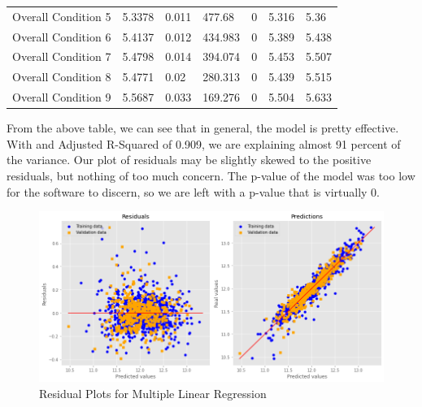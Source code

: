 \documentclass{article}
\begin{document}
\begin{table}[]
\begin{tabular}{lllllll}
		Overall Condition 5              & 5.3378                    & 0.011                        & 477.68                 & 0                                       & 5.316                         & 5.36                          \\
		Overall Condition 6              & 5.4137                    & 0.012                        & 434.983                & 0                                       & 5.389                         & 5.438                         \\
		Overall Condition 7              & 5.4798                    & 0.014                        & 394.074                & 0                                       & 5.453                         & 5.507                         \\
		Overall Condition 8              & 5.4771                    & 0.02                         & 280.313                & 0                                       & 5.439                         & 5.515                         \\
		Overall Condition 9              & 5.5687                    & 0.033                        & 169.276                & 0                                       & 5.504                         & 5.633                        
		\end{tabular}
		\end{table}

	From the above table, we can see that in general, the model is pretty effective. With and Adjusted R-Squared of 0.909, we are explaining almost 91 percent of the variance. Our plot of residuals may be slightly skewed to the positive residuals, but nothing of too much concern. The p-value of the model was too low for the software to discern, so we are left with a p-value that is virtually 0. 

	\begin{figure}
		\includegraphics[width=\textwidth]{mlrplot}
		\caption{Residual Plots for Multiple Linear Regression}
		\label{fig:skew}
	\end{figure}
\end{document}
